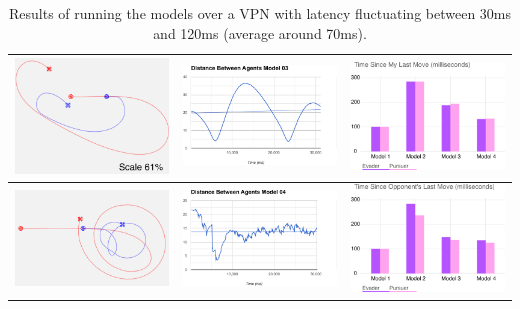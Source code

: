 \documentclass{article}
\begin{document}
\begin{table}[t]
\begin{tabular}{p{5.2cm}p{5.2cm}p{5.2cm} }
		\hline
		\includegraphics[width=5cm]{model03-vpn}&
		\includegraphics[width=5cm]{distance03-vpn}&
		\includegraphics[width=5cm]{my_move_vpn}\\			
		\hline
		\includegraphics[width=5cm]{model04-vpn}&
		\includegraphics[width=5cm]{distance04-vpn}&
		\includegraphics[width=5cm]{opp_move_vpn}\\			
		\hline
	\end{tabular}
	\caption{Results of running the models over a VPN with latency fluctuating between 30ms and 120ms (average around 70ms).}
	\label{tab:ResultsVPN}
\end{table}
\end{document}
